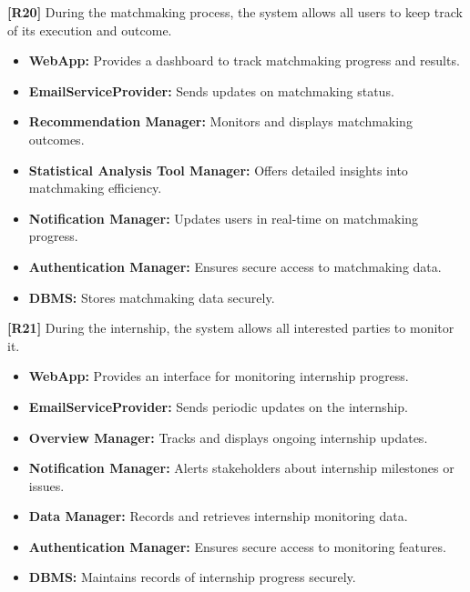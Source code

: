 \textbf{[R20]} During the matchmaking process, the system allows all users to keep track of its execution and outcome.  
\begin{itemize}
    \item \textbf{WebApp:} Provides a dashboard to track matchmaking progress and results.  
    \item \textbf{EmailServiceProvider:} Sends updates on matchmaking status.  
    \item \textbf{Recommendation Manager:} Monitors and displays matchmaking outcomes.  
    \item \textbf{Statistical Analysis Tool Manager:} Offers detailed insights into matchmaking efficiency.  
    \item \textbf{Notification Manager:} Updates users in real-time on matchmaking progress.   
    \item \textbf{Authentication Manager:} Ensures secure access to matchmaking data.  
    \item \textbf{DBMS:} Stores matchmaking data securely.  
\end{itemize}  

\textbf{[R21]} During the internship, the system allows all interested parties to monitor it.  
\begin{itemize}
    \item \textbf{WebApp:} Provides an interface for monitoring internship progress.  
    \item \textbf{EmailServiceProvider:} Sends periodic updates on the internship.  
    \item \textbf{Overview Manager:} Tracks and displays ongoing internship updates.  
    \item \textbf{Notification Manager:} Alerts stakeholders about internship milestones or issues.  
    \item \textbf{Data Manager:} Records and retrieves internship monitoring data.  
    \item \textbf{Authentication Manager:} Ensures secure access to monitoring features.  
    \item \textbf{DBMS:} Maintains records of internship progress securely.  
\end{itemize}  

